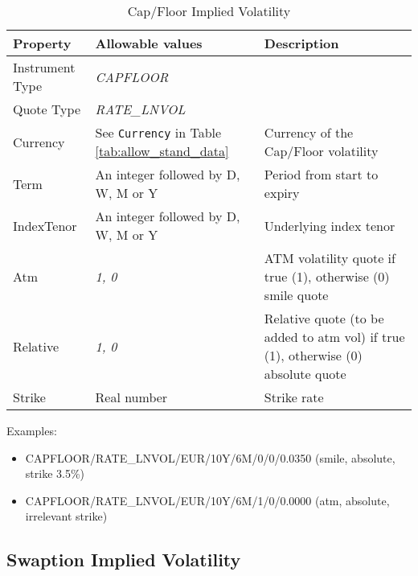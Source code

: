 \begin{table}[H]
\centering
  \begin{tabular}{|p{3cm}|p{3.5cm}|p{7cm}|}
    \hline
    {\bf Property} & {\bf Allowable values} & {\bf Description} \\ \hline
    Instrument Type & \emph{CAPFLOOR} & \\ \hline
    Quote Type & \emph{RATE\_LNVOL} & \\ \hline
    Currency & See \lstinline!Currency! in Table \ref{tab:allow_stand_data}&  Currency of the Cap/Floor volatility\\ \hline
    Term & An integer followed by D, W, M or Y & Period from start to expiry \\ \hline
    IndexTenor & An integer followed by D, W, M or Y & Underlying index tenor \\ \hline
    Atm & \emph{1, 0} & ATM volatility quote if true (1), otherwise (0) smile quote\\ \hline
    Relative & \emph{1, 0} & Relative quote (to be added to atm vol) if true (1), otherwise (0) absolute quote\\ \hline
    Strike & Real number & Strike rate\\ \hline
  \end{tabular}
  \caption{Cap/Floor Implied Volatility}
  \label{tab:capfloor_implvol_quote}
\end{table}


\medskip
Examples:
\begin{itemize}
\item {CAPFLOOR/RATE\_LNVOL/EUR/10Y/6M/0/0/0.0350} (smile, absolute, strike 3.5\%)
\item {CAPFLOOR/RATE\_LNVOL/EUR/10Y/6M/1/0/0.0000} (atm, absolute, irrelevant strike)
\end{itemize}

\subsection{Swaption Implied Volatility}

